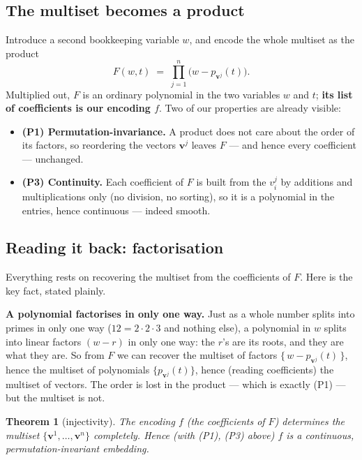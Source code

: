 \documentclass[11pt,a4paper]{article}
\theoremstyle{definition}
\theoremstyle{plain}
\newtheorem{theorem}[definition]{Theorem}
\newcommand{\bvec}[1]{\mathbf{#1}}
\begin{document}
\subsection{The multiset becomes a product}

Introduce a second bookkeeping variable $w$, and encode the whole multiset as the
product
\begin{equation}\label{eq:F}
   F(w,t)\;=\;\prod_{j=1}^{n}\bigl(w-p_{\bvec v^j}(t)\bigr).
\end{equation}
Multiplied out, $F$ is an ordinary polynomial in the two variables $w$ and $t$;
\textbf{its list of coefficients is our encoding $f$}. Two of our properties are
already visible:
\begin{itemize}[leftmargin=*]
\item \textbf{(P1) Permutation-invariance.} A product does not care about the order
      of its factors, so reordering the vectors $\bvec v^j$ leaves $F$ --- and
      hence every coefficient --- unchanged.
\item \textbf{(P3) Continuity.} Each coefficient of $F$ is built from the $v^j_i$
      by additions and multiplications only (no division, no sorting), so it is a
      polynomial in the entries, hence continuous --- indeed smooth.
\end{itemize}

\subsection{Reading it back: factorisation}

Everything rests on recovering the multiset from the coefficients of $F$. Here is
the key fact, stated plainly.

\begin{tcolorbox}[ideabox]
\textbf{A polynomial factorises in only one way.} Just as a whole number splits
into primes in only one way ($12=2\cdot2\cdot3$ and nothing else), a polynomial in
$w$ splits into linear factors $(w-r)$ in only one way: the $r$'s are its roots,
and they are what they are. So from $F$ we can recover the multiset of factors
$\{\,w-p_{\bvec v^j}(t)\,\}$, hence the multiset of polynomials
$\{p_{\bvec v^j}(t)\}$, hence (reading coefficients) the multiset of vectors. The
order is lost in the product --- which is exactly (P1) --- but the multiset is not.
\end{tcolorbox}

\begin{theorem}[injectivity]\label{thm:inj}
The encoding $f$ (the coefficients of $F$) determines the multiset
$\{\bvec v^1,\dots,\bvec v^n\}$ completely. Hence (with (P1), (P3) above) $f$ is a
continuous, permutation-invariant embedding.
\end{theorem}
\end{document}
